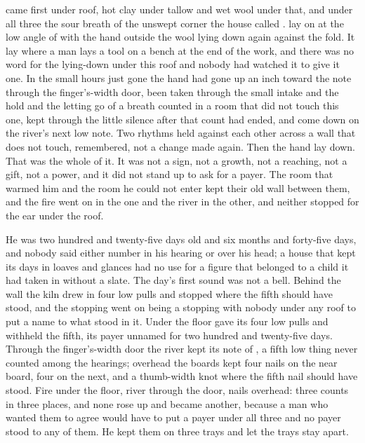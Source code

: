 
 came first under  roof, hot clay under tallow and wet wool under that, and under all three the sour  breath of the unswept corner the house called .  lay on  at the low angle of  with the hand outside the wool lying down again against the fold. It lay where a man lays a tool on a bench at the end of the work, and there was no word for the lying-down under this roof and nobody had watched it to give it one. In the small hours just gone the hand had gone up an inch toward the note through the finger's-width door, been taken through the small intake and the hold and the letting go of a breath counted in a room that did not touch this one, kept through the little silence after that count had ended, and come down on the river's next low note. Two rhythms held against each other across a wall that does not touch, remembered, not a change made again. Then the hand lay down. That was the whole of it. It was not a sign, not a growth, not a reaching, not a gift, not a power, and it did not stand up to ask for a payer. The room that warmed him and the room he could not enter kept their old wall between them, and the fire went on in the one and the river in the other, and neither stopped for the ear under the roof.

He was two hundred and twenty-five days old and six months and forty-five days, and nobody said either number in his hearing or over his head; a house that kept its days in loaves and glances had no use for a figure that belonged to a child it had taken in without a slate. The day's first sound was not a bell. Behind the wall the kiln drew in four low pulls and stopped where the fifth should have stood, and the stopping went on being a stopping with nobody under any roof to put a name to what stood in it. Under the floor  gave its four low pulls and withheld the fifth, its payer unnamed for two hundred and twenty-five days. Through the finger's-width door the river kept its note of , a fifth low thing never counted among the hearings; overhead the boards kept four nails on the near board, four on the next, and a thumb-width knot where the fifth nail should have stood. Fire under the floor, river through the door, nails overhead: three counts in three places, and none rose up and became another, because a man who wanted them to agree would have to put a payer under all three and no payer stood to any of them. He kept them on three trays and let the trays stay apart.

